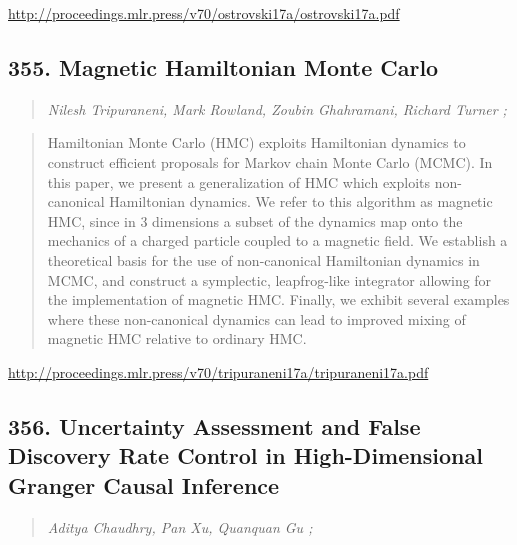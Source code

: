 \documentclass{article}
\begin{document}
\href{http://proceedings.mlr.press/v70/ostrovski17a/ostrovski17a.pdf}{http://proceedings.mlr.press/v70/ostrovski17a/ostrovski17a.pdf}

\subsection{355. Magnetic Hamiltonian Monte Carlo}

\begin{quote}
\footnotesize{\textit{Nilesh Tripuraneni, Mark Rowland, Zoubin Ghahramani, Richard Turner ;}}
\end{quote}

\begin{quote}
    Hamiltonian Monte Carlo (HMC) exploits Hamiltonian dynamics to construct efficient proposals for Markov chain Monte Carlo (MCMC). In this paper, we present a generalization of HMC which exploits non-canonical Hamiltonian dynamics. We refer to this algorithm as magnetic HMC, since in 3 dimensions a subset of the dynamics map onto the mechanics of a charged particle coupled to a magnetic field. We establish a theoretical basis for the use of non-canonical Hamiltonian dynamics in MCMC, and construct a symplectic, leapfrog-like integrator allowing for the implementation of magnetic HMC. Finally, we exhibit several examples where these non-canonical dynamics can lead to improved mixing of magnetic HMC relative to ordinary HMC.  \end{quote}

\href{http://proceedings.mlr.press/v70/tripuraneni17a/tripuraneni17a.pdf}{http://proceedings.mlr.press/v70/tripuraneni17a/tripuraneni17a.pdf}

\subsection{356. Uncertainty Assessment and False Discovery Rate Control in High-Dimensional Granger Causal Inference}

\begin{quote}
\footnotesize{\textit{Aditya Chaudhry, Pan Xu, Quanquan Gu ;}}
\end{quote}
\end{document}
